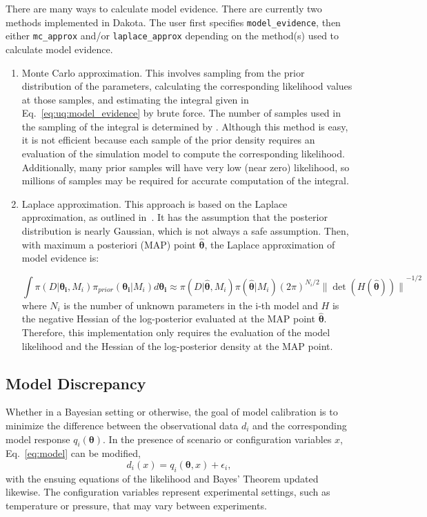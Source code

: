 There are many ways to calculate model evidence. There are currently two methods 
implemented in Dakota. The user first specifies \texttt{model\_evidence}, then either 
\texttt{mc\_approx} and/or \texttt{laplace\_approx} depending on the
method(s) used to calculate model evidence.
\begin{enumerate}
\item Monte Carlo approximation.  This involves sampling from the prior 
distribution of the parameters, calculating the corresponding likelihood values 
at those samples, and  estimating the integral given in Eq.~\ref{eq:uq:model_evidence} 
by brute force.  The number of samples used in the sampling of the integral is 
determined by . Although this method is easy, 
it is not efficient because each sample of the prior density requires 
an evaluation of the simulation model to compute the corresponding likelihood.  
Additionally, many prior samples will have very low (near zero) likelihood, 
so millions of samples may be required for accurate computation of the integral. 
\item Laplace approximation.  This approach is based on the Laplace approximation, 
as outlined in~\cite{Wasserman}.  It has the assumption that the posterior distribution 
is nearly Gaussian, which is not always a safe assumption. 
Then, with maximum a posteriori (MAP) point $\hat{\boldsymbol{\theta}}$, 
the Laplace approximation of model evidence is: 
  
\begin{equation}
\int \pi(D|\boldsymbol{\theta_i},M_i)\pi_{prior}(\boldsymbol{\theta_i}|M_i)d \boldsymbol{\theta_i} \approx \pi(D|\hat{\boldsymbol{\theta}},M_i)\pi(\hat{\boldsymbol{\theta}}|M_i)(2\pi)^{N_i/2}{\|\det(H(\hat{\boldsymbol{\theta}}))\|}^{-1/2}
\end{equation}
where $N_i$ is the number of unknown parameters in the i-th model and 
$H$ is the negative Hessian of the log-posterior evaluated at the MAP point 
$\hat{\boldsymbol{\theta}}$. 
Therefore, this implementation only requires the evaluation of the model likelihood 
and the Hessian of the log-posterior density at the MAP point. 

\end{enumerate}

\subsection{Model Discrepancy}
Whether in a Bayesian setting or otherwise, the goal of model calibration
is to minimize the difference between the observational data $d_i$ and 
the corresponding model response $q_i(\boldsymbol{\theta})$. In the 
presence of scenario or configuration variables $x$, Eq.~\ref{eq:model} can
be modified,
\begin{equation}
d_i(x) = q_i\left(\boldsymbol{\theta}, x\right) + \epsilon_i,
\end{equation} 
with the ensuing equations of the likelihood and Bayes' Theorem updated 
likewise. The configuration variables represent experimental settings, such 
as temperature or pressure, that may vary between experiments. 

